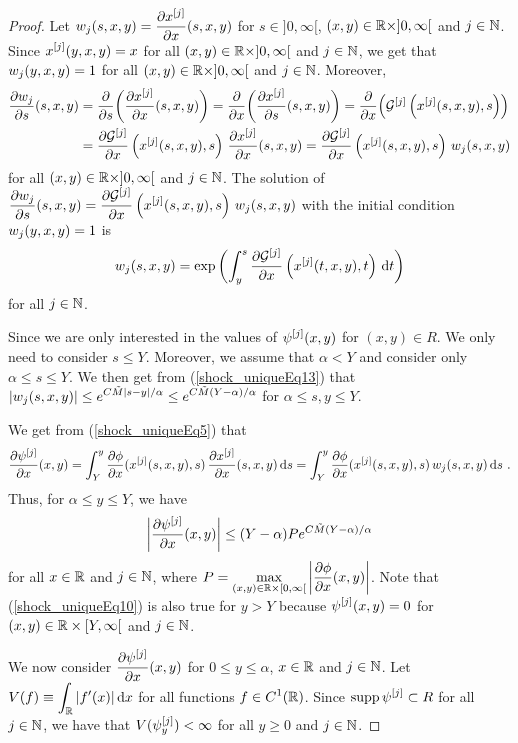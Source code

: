 \begin{proof}
Let $\DS w_j(s,x,y) = \pdydx{x^{[j]}}{x}(s,x,y)$ for
$s\in ]0,\infty[$,
$(x,y) \in \RR \times ]0,\infty[$ and $j \in \NN$.\\
Since $\DS x^{[j]}(y,x,y) = x$ for all
$(x,y) \in \RR \times ]0,\infty[$ and $j \in \NN$, we get that
$\DS w_j(y,x,y) = 1$ for all $(x,y) \in \RR \times ]0,\infty[$
and $j \in \NN$.  Moreover,
\begin{align*}
\pdydx{w_j}{s}(s,x,y) &= \pdfdx{\left(\pdydx{x^{[j]}}{x}(s,x,y)\right)}{s}
= \pdfdx{\left(\pdydx{x^{[j]}}{s}(s,x,y)\right)}{x}
= \pdfdx{\left({\cal G}^{[j]}\left(x^{[j]}(s,x,y),s\right)\right)}{x} \\
&= \pdydx{{\cal G}^{[j]}}{x}\left(x^{[j]}(s,x,y),s\right)\,
\pdydx{x^{[j]}}{x}(s,x,y)
= \pdydx{{\cal G}^{[j]}}{x}\left(x^{[j]}(s,x,y),s\right)\,
w_j(s,x,y)
\end{align*}
for all $(x,y) \in \RR \times ]0,\infty[$ and $j \in \NN$.  The
solution of\\
$\DS \pdydx{w_j}{s}(s,x,y) =
\pdydx{{\cal G}^{[j]}}{x}\left(x^{[j]}(s,x,y),s\right)\, w_j(s,x,y)$
with the initial condition
$\DS w_j(y,x,y) = 1$ is
\[
w_j(s,x,y) = \text{exp}\left(
\int_y^s \pdydx{{\cal G}^{[j]}}{x}\left(x^{[j]}(t,x,y),t\right) \dx{t}\right)
\]
for all $j \in \NN$.

Since we are only interested in the values of
$\DS \psi^{[j]}(x,y)$ for
$(x,y) \in R$.  We only need to consider $s \leq Y$.
Moreover, we assume that $\alpha < Y$ and consider only
$\alpha \leq s \leq Y$.  We then get from (\ref{shock_uniqueEq13}) that
$\DS |w_j(s,x,y)| \leq e^{C\tilde{M}|s-y|/\alpha}
\leq e^{C\tilde{M}(Y-\alpha)/\alpha}$ for $\alpha \leq s,y \leq Y$.

We get from (\ref{shock_uniqueEq5}) that
\[
\pdydx{\psi^{[j]}}{x}(x,y) =
\int_Y^y \pdydx{\phi}{x}(x^{[j]}(s,x,y),s)\,
\pdydx{x^{[j]}}{x}(s,x,y) \dx{s}
=\int_Y^y \pdydx{\phi}{x}(x^{[j]}(s,x,y),s)\, w_j(s,x,y) \dx{s} \ .
\]
Thus, for $\alpha \leq y \leq Y$, we have
\begin{equation} \label{shock_uniqueEq10}
\left| \pdydx{\psi^{[j]}}{x}(x,y) \right| \leq (Y-\alpha) P 
e^{C\tilde{M}(Y-\alpha)/\alpha}
\end{equation}
for all $x\in \RR$ and $j \in \NN$, where
$\DS P = \max_{(x,y)\in \RR\times [0,\infty[}
\left|\pdydx{\phi}{x}(x,y) \right|$.  Note that
(\ref{shock_uniqueEq10}) is also true for $y>Y$ because
$\DS \psi^{[j]}(x,y) = 0$ for $(x,y) \in \RR\times [Y,\infty[$
and $j \in \NN$.

We now consider $\DS \pdydx{\psi^{[j]}}{x}(x,y)$ for
$0 \leq y \leq \alpha$, $x\in \RR$ and $j \in \NN$.
Let $\DS V(f) \equiv \int_\RR |f'(x)|\dx{x}$ for all
functions $\DS f \in C^1(\RR)$.
Since $\DS \supp \psi^{[j]} \subset R$ for all $j \in \NN$,
we have that $\DS V(\psi^{[j]}_y) < \infty$
for all $y \geq 0$ and $ j \in \NN$.


\end{proof}

